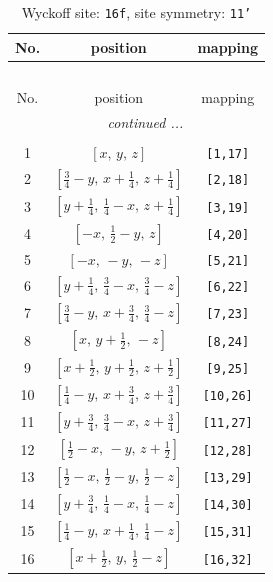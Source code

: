 \documentclass[fleqn,8pt]{jsarticle}
\begin{document}
\begin{longtable}{ccc}
\caption{Wyckoff site: {\tt 16f}, site symmetry: {\tt 11'}}
 \\
 \hline \hline
No. & position & mapping \\ \hline \endfirsthead

\multicolumn{2}{l}{\tablename\ \thetable{}} \\
 \hline \hline
No. & position & mapping \\ \hline \endhead

 \hline \hline
\multicolumn{2}{r}{\footnotesize\it continued ...} \\ \endfoot

 \hline \hline
\multicolumn{2}{r}{} \\ \endlastfoot

1 & $\left[ x,\, y,\, z \right]$ & {\tt [1,17]} \\ \hline
2 & $\left[ \frac{3}{4} - y,\, x + \frac{1}{4},\, z + \frac{1}{4} \right]$ & {\tt [2,18]} \\ \hline
3 & $\left[ y + \frac{1}{4},\, \frac{1}{4} - x,\, z + \frac{1}{4} \right]$ & {\tt [3,19]} \\ \hline
4 & $\left[ - x,\, \frac{1}{2} - y,\, z \right]$ & {\tt [4,20]} \\ \hline
5 & $\left[ - x,\, - y,\, - z \right]$ & {\tt [5,21]} \\ \hline
6 & $\left[ y + \frac{1}{4},\, \frac{3}{4} - x,\, \frac{3}{4} - z \right]$ & {\tt [6,22]} \\ \hline
7 & $\left[ \frac{3}{4} - y,\, x + \frac{3}{4},\, \frac{3}{4} - z \right]$ & {\tt [7,23]} \\ \hline
8 & $\left[ x,\, y + \frac{1}{2},\, - z \right]$ & {\tt [8,24]} \\ \hline
9 & $\left[ x + \frac{1}{2},\, y + \frac{1}{2},\, z + \frac{1}{2} \right]$ & {\tt [9,25]} \\ \hline
10 & $\left[ \frac{1}{4} - y,\, x + \frac{3}{4},\, z + \frac{3}{4} \right]$ & {\tt [10,26]} \\ \hline
11 & $\left[ y + \frac{3}{4},\, \frac{3}{4} - x,\, z + \frac{3}{4} \right]$ & {\tt [11,27]} \\ \hline
12 & $\left[ \frac{1}{2} - x,\, - y,\, z + \frac{1}{2} \right]$ & {\tt [12,28]} \\ \hline
13 & $\left[ \frac{1}{2} - x,\, \frac{1}{2} - y,\, \frac{1}{2} - z \right]$ & {\tt [13,29]} \\ \hline
14 & $\left[ y + \frac{3}{4},\, \frac{1}{4} - x,\, \frac{1}{4} - z \right]$ & {\tt [14,30]} \\ \hline
15 & $\left[ \frac{1}{4} - y,\, x + \frac{1}{4},\, \frac{1}{4} - z \right]$ & {\tt [15,31]} \\ \hline
16 & $\left[ x + \frac{1}{2},\, y,\, \frac{1}{2} - z \right]$ & {\tt [16,32]} \\
\end{longtable}
\end{document}
